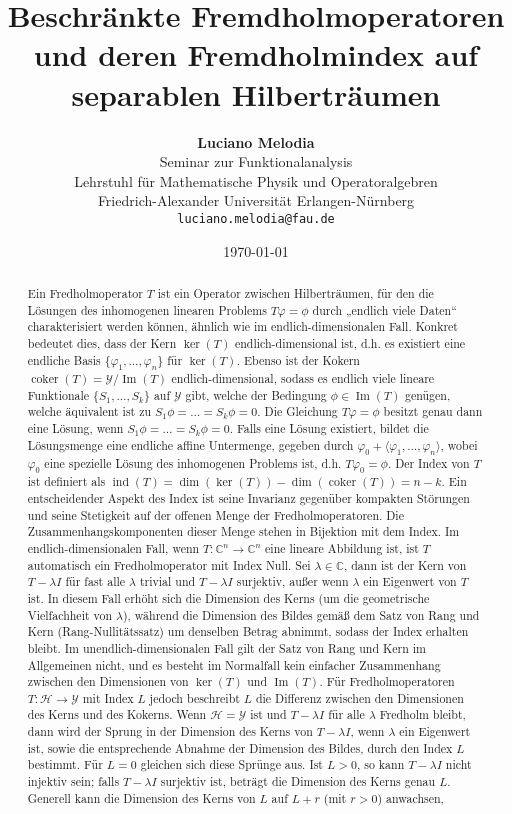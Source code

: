 \documentclass[11pt, hidelinks]{article}
\title{\textbf{Beschränkte Fremdholmoperatoren und deren Fremdholmindex auf separablen Hilberträumen}}
\author{
\textbf{Luciano Melodia} \\
Seminar zur Funktionalanalysis \\
Lehrstuhl für Mathematische Physik und Operatoralgebren \\
Friedrich-Alexander Universität Erlangen-Nürnberg \\
\texttt{luciano.melodia@fau.de}}
\date{\today}
\numberwithin{conj}{section}
\begin{document}
\hypersetup{bookmarksnumbered=true}
\maketitle

\begin{abstract}
Ein Fredholmoperator \(T\) ist ein Operator zwischen Hilberträumen, für den die Lösungen des inhomogenen linearen Problems \(T \varphi = \phi\) durch „endlich viele Daten“ charakterisiert werden können, ähnlich wie im endlich-dimensionalen Fall. Konkret bedeutet dies, dass der Kern \(\ker(T)\) endlich-dimensional ist, d.h. es existiert eine endliche Basis \(\{\varphi_1, \dots, \varphi_n\}\) für \(\ker(T)\). Ebenso ist der Kokern \(\operatorname{coker}(T) = \mathcal{Y} / \operatorname{Im}(T)\) endlich-dimensional, sodass es endlich viele lineare Funktionale \(\{S_1, \dots, S_k\}\) auf \(\mathcal{Y}\) gibt, welche der Bedingung \(\phi \in \operatorname{Im}(T)\) genügen, welche äquivalent ist zu \(S_1 \phi = \dots = S_k \phi  = 0\). Die Gleichung \(T \varphi = \phi\) besitzt genau dann eine Lösung, wenn \(S_1 \phi = \dots = S_k \phi = 0\). Falls eine Lösung existiert, bildet die Lösungsmenge eine endliche affine Untermenge, gegeben durch \(\varphi_0 + \langle \varphi_1, \dots, \varphi_n \rangle\), wobei \(\varphi_0\) eine spezielle Lösung des inhomogenen Problems ist, d.h. \(T \varphi_0 = \phi\). Der Index von \(T\) ist definiert als \(\operatorname{ind}(T) = \dim(\ker(T)) - \dim(\operatorname{coker}(T)) = n - k\). Ein entscheidender Aspekt des Index ist seine Invarianz gegenüber kompakten Störungen und seine Stetigkeit auf der offenen Menge der Fredholmoperatoren. Die Zusammenhangskomponenten dieser Menge stehen in Bijektion mit dem Index. Im endlich-dimensionalen Fall, wenn \(T: \mathbb{C}^n \to \mathbb{C}^n\) eine lineare Abbildung ist, ist \(T\) automatisch ein Fredholmoperator mit Index Null. Sei \(\lambda \in \mathbb{C}\), dann ist der Kern von \(T - \lambda I\) für fast alle \(\lambda\) trivial und \(T - \lambda I\) surjektiv, außer wenn \(\lambda\) ein Eigenwert von \(T\) ist. In diesem Fall erhöht sich die Dimension des Kerns (um die geometrische Vielfachheit von \(\lambda\)), während die Dimension des Bildes gemäß dem Satz von Rang und Kern (Rang-Nullitätssatz) um denselben Betrag abnimmt, sodass der Index erhalten bleibt. Im unendlich-dimensionalen Fall gilt der Satz von Rang und Kern im Allgemeinen nicht, und es besteht im Normalfall kein einfacher Zusammenhang zwischen den Dimensionen von \(\ker(T)\) und \(\operatorname{Im}(T)\). Für Fredholmoperatoren \(T: \mathcal{H} \to \mathcal{Y}\) mit Index \(L\) jedoch beschreibt \(L\) die Differenz zwischen den Dimensionen des Kerns und des Kokerns. Wenn \(\mathcal{H} = \mathcal{Y}\) ist und \(T - \lambda I\) für alle \(\lambda\) Fredholm bleibt, dann wird der Sprung in der Dimension des Kerns von \(T - \lambda I\), wenn \(\lambda\) ein Eigenwert ist, sowie die entsprechende Abnahme der Dimension des Bildes, durch den Index \(L\) bestimmt. Für \(L = 0\) gleichen sich diese Sprünge aus. Ist \(L > 0\), so kann \(T - \lambda I\) nicht injektiv sein; falls \(T - \lambda I\) surjektiv ist, beträgt die Dimension des Kerns genau \(L\). Generell kann die Dimension des Kerns von \(L\) auf \(L + r\) (mit \(r > 0\)) anwachsen, 
\end{abstract}
\end{document}
